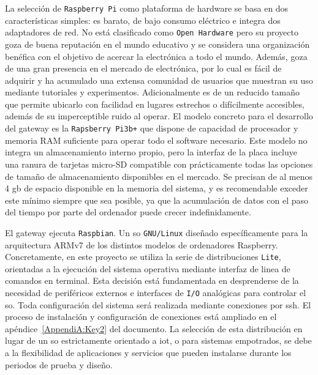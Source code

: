 La selección de \verb|Raspberry Pi| como plataforma de hardware se basa en dos características simples: es barato, de bajo consumo eléctrico e integra dos adaptadores de red. No está clasificado como \verb|Open Hardware| pero su proyecto goza de buena reputación en el mundo educativo y se considera una organización benéfica con el objetivo de acercar la electrónica a todo el mundo. Además, goza de una gran presencia en el mercado de electrónica, por lo cual es fácil de adquirir y ha acumulado una extensa comunidad de usuarios que muestran su uso mediante tutoriales y experimentos. Adicionalmente es de un reducido tamaño que permite ubicarlo con facilidad en lugares estrechos o difícilmente accesibles, además de su imperceptible ruido al operar. El modelo concreto para el desarrollo del \gls{gateway} es la \verb|Rapsberry Pi3b+| que dispone de capacidad de procesador y memoria RAM suficiente para operar todo el software necesario. Este modelo no integra un almacenamiento interno propio, pero la interfaz de la placa incluye una ranura de tarjetas micro-SD compatible con prácticamente todas las opciones de tamaño de almacenamiento disponibles en el mercado. Se precisan de al menos 4 \gls{gb} de espacio disponible en la memoria del sistema, y es recomendable exceder este mínimo siempre que sea posible, ya que la acumulación de datos con el paso del tiempo por parte del ordenador puede crecer indefinidamente.

\vspace{1cm}

El \gls{gateway} ejecuta \verb|Raspbian|. Un \gls{so} \verb|GNU/Linux| diseñado específicamente para la arquitectura ARMv7 de los distintos modelos de ordenadores Raspberry. Concretamente, en este proyecto se utiliza la serie de distribuciones \verb|Lite|, orientadas a la ejecución del sistema operativa mediante interfaz de linea de comandos en terminal. Esta decisión está fundamentada en desprenderse de la necesidad de periféricos externos e interfaces de \verb|I/O| analógicas para controlar el \gls{so}. Toda configuración del sistema será realizada mediante conexiones por \gls{ssh}. El proceso de instalación y configuración de conexiones está ampliado en el apéndice~\ref{AppendiA:Key2} del documento. La selección de esta distribución en lugar de un \gls{so} estrictamente orientado a \gls{iot}, o para sistemas empotrados, se debe a la flexibilidad de aplicaciones y servicios que pueden instalarse durante los periodos de prueba y diseño.

\vspace{1cm}

